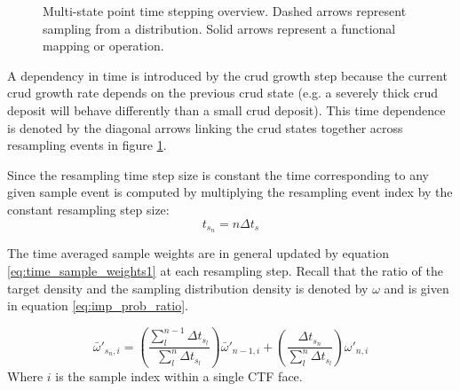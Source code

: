 \begin{figure}
\caption{Multi-state point time stepping overview. Dashed arrows represent sampling from a distribution.  Solid arrows represent a functional mapping or operation.}
\label{fig:stepscheme}
\end{figure}

A dependency in time is introduced by the crud growth step because the current crud growth rate depends on the previous crud state (e.g. a severely thick crud deposit will behave differently than a small crud deposit).  This time dependence is denoted by the diagonal arrows linking the crud states together across resampling events in figure \ref{fig:stepscheme}.

Since the resampling time step size is constant the time corresponding to any given sample event is computed by multiplying the resampling event index by the constant resampling step size:
\begin{equation}
t_{s_n} = n\Delta t_s
\end{equation}

The time averaged sample weights are in general updated by equation \ref{eq:time_sample_weights1} at each resampling step.
Recall that the ratio of the target density and the sampling distribution density is denoted by $\omega$ and is given in equation \ref{eq:imp_prob_ratio}.

\begin{equation}
\bar \omega'_{{s_n},i} =
\left( \frac{\sum_{l}^{n-1} \Delta t_{s_l}}{\sum_l^n \Delta t_{s_l}} \right) \bar \omega'_{n-1,i} +
\left( \frac{\Delta t_{s_n}}{\sum_l^n \Delta t_{s_l}} \right) \omega'_{n,i}
\label{eq:time_sample_weights1}
\end{equation}
Where $i$ is the sample index within a single CTF face.

